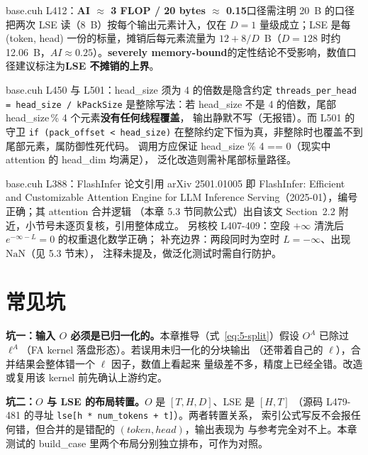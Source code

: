 \begin{kaogu}[F4]{base.cuh L412：\textbf{AI $\approx$ 3 FLOP / 20 bytes $\approx$ 0.15}口径需注明}
  20~B 的口径把两次 LSE 读（8~B）按每个输出元素计入，仅在
  $D = 1$ 量级成立；LSE 是每 (token, head) 一份的标量，摊销后每元素流量为
  $12 + 8/D$~B（$D = 128$ 时约 12.06~B，$AI \approx 0.25$）。\textbf{severely
  memory-bound}的定性结论不受影响，数值口径建议标注为\textbf{LSE 不摊销的上界}。
\end{kaogu}

\begin{kaogu}[F3]{base.cuh L450 与 L501：head\_size 须为 4 的倍数是隐含约定}
  \texttt{threads\_\allowbreak{}per\_\allowbreak{}head =\allowbreak{} head\_\allowbreak{}size /\allowbreak{} k\allowbreak{}Pack\allowbreak{}Size} 是整除写法：若
  head\_size 不是 4 的倍数，尾部 head\_size\,\% 4 个元素\textbf{没有任何线程覆盖}，
  输出静默不写（无报错）。而 L501 的守卫 \texttt{if \allowbreak{}(pack\_\allowbreak{}offset \allowbreak{}< head\_\allowbreak{}size)}
  在整除约定下恒为真，非整除时也覆盖不到尾部元素，属防御性死代码。
  调用方应保证 head\_size \% 4 == 0（现实中 attention 的 head\_dim 均满足），
  泛化改造则需补尾部标量路径。
\end{kaogu}

\begin{kaogu}[F5 核校通过]{base.cuh L388：FlashInfer 论文引用}
  arXiv 2501.01005 即 FlashInfer: Efficient and Customizable Attention Engine
  for LLM Inference Serving（2025-01），编号正确；其 attention 合并逻辑
  （本章 5.3 节同款公式）出自该文 Section~2.2 附近，小节号未逐页复核，引用整体成立。
  另核校 L407-409：空段 $+\infty$ 清洗后 $e^{-\infty - L} = 0$ 的权重退化数学正确；
  补充边界：两段同时为空时 $L = -\infty$、出现 $\mathrm{NaN}$（见 5.3 节末），
  注释未提及，做泛化测试时需自行防护。
\end{kaogu}

\section{常见坑}

\textbf{坑一：输入 $O$ 必须是已归一化的。}本章推导（式~\ref{eq:5-split}）假设
$O^{A}$ 已除过 $\ell^{A}$（FA kernel 落盘形态）。若误用未归一化的分块输出
（还带着自己的 $\ell$），合并结果会整体错一个 $\ell$ 因子，数值上看起来
量级差不多，精度上已经全错。改造或复用该 kernel 前先确认上游约定。

\textbf{坑二：$O$ 与 LSE 的布局转置。}$O$ 是 $[T, H, D]$、LSE 是 $[H, T]$
（源码 L479-481 的寻址 \texttt{lse[h * num\_tokens + t]}）。两者转置关系，
索引公式写反不会报任何错，但合并的是错配的 $(token, head)$，输出表现为
与参考完全对不上。本章测试的 build\_case 里两个布局分别独立排布，可作为对照。

